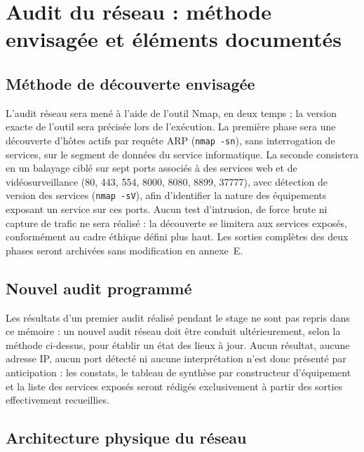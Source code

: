 \section{Audit du réseau : méthode envisagée et éléments documentés}

\subsection{Méthode de découverte envisagée}

L'audit réseau sera mené à l'aide de l'outil Nmap, en deux temps ; la version exacte de l'outil sera précisée lors de l'exécution. La première phase sera une découverte d'hôtes actifs par requête ARP (\texttt{nmap -sn}), sans interrogation de services, sur le segment de données du service informatique. La seconde consistera en un balayage ciblé sur sept ports associés à des services web et de vidéosurveillance (80, 443, 554, 8000, 8080, 8899, 37777), avec détection de version des services (\texttt{nmap -sV}), afin d'identifier la nature des équipements exposant un service sur ces ports. Aucun test d'intrusion, de force brute ni capture de trafic ne sera réalisé : la découverte se limitera aux services exposés, conformément au cadre éthique défini plus haut. Les sorties complètes des deux phases seront archivées sans modification en annexe~E.

\subsection{Nouvel audit programmé}

Les résultats d'un premier audit réalisé pendant le stage ne sont pas repris dans ce mémoire : un nouvel audit réseau doit être conduit ultérieurement, selon la méthode ci-dessus, pour établir un état des lieux à jour. Aucun résultat, aucune adresse IP, aucun port détecté ni aucune interprétation n'est donc présenté par anticipation : les constats, le tableau de synthèse par constructeur d'équipement et la liste des services exposés seront rédigés exclusivement à partir des sorties effectivement recueillies. 

\subsection{Architecture physique du réseau}

